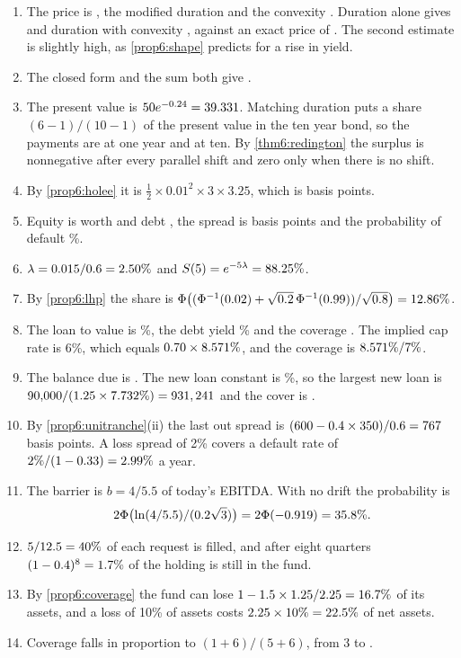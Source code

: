 \begin{chapterrefs}
\begin{enumerate}[label=\textbf{6.\arabic*}, leftmargin=*]
  \item The price is \xsOneP, the modified duration \xsOneD{} and the convexity \xsOneC. Duration alone
  gives \xsOneDur{} and duration with convexity \xsOneQd, against an exact price of \xsOneEx. The
  second estimate is slightly high, as \cref{prop6:shape} predicts for a rise in yield.
  \item The closed form and the sum both give \xsTwoD.
  \item The present value is $50e^{-0.24}=39.331$. Matching duration puts a share $(6-1)/(10-1)$ of
  the present value in the ten year bond, so the payments are \xsThreeA{} at one year and \xsThreeB{} at
  ten. By \cref{thm6:redington} the surplus is nonnegative after every parallel shift and zero only
  when there is no shift.
  \item By \cref{prop6:holee} it is $\tfrac12\times0.01^2\times3\times3.25$, which is \xsFour{} basis points.
  \item Equity is worth \xsFiveE{} and debt \xsFiveDebt, the spread is \xsFiveS{} basis points and the
  probability of default \xsFivePd\%.
  \item $\lambda=0.015/0.6=2.50\%$ and $S(5)=e^{-5\lambda}=88.25\%$.
  \item By \cref{prop6:lhp} the share is
  $\Phi\bigl((\Phi^{-1}(0.02)+\sqrt{0.2}\,\Phi^{-1}(0.99))/\sqrt{0.8}\bigr)=12.86\%$.
  \item The loan to value is \xsEightLtv\%, the debt yield \xsEightDy\% and the coverage
  \xsEightDscr. The implied cap rate is 6\%, which equals $0.70\times8.571\%$, and the coverage is
  $8.571\%/7\%$.
  \item The balance due is \xsNineB. The new loan constant is \xsNineK\%, so the largest new loan is
  $90{,}000/(1.25\times7.732\%)=931,241$ and the cover is \xsNineCover.
  \item By \cref{prop6:unitranche}(ii) the last out spread is $(600-0.4\times350)/0.6=767$ basis
  points. A loss spread of 2\% covers a default rate of $2\%/(1-0.33)=2.99\%$ a year.
  \item The barrier is $b=4/5.5$ of today's EBITDA. With no drift the probability is
  \[2\Phi\bigl(\ln(4/5.5)/(0.2\sqrt3)\bigr)=2\Phi(-0.919)=35.8\%.\]
  \item $5/12.5=40\%$ of each request is filled, and after eight quarters $(1-0.4)^8=1.7\%$ of
  the holding is still in the fund.
  \item By \cref{prop6:coverage} the fund can lose $1-1.5\times1.25/2.25=16.7\%$ of its assets, and a
  loss of 10\% of assets costs $2.25\times10\%=22.5\%$ of net assets.
  \item Coverage falls in proportion to $(1+6)/(5+6)$, from 3 to \xdIcr.
\end{enumerate}


\end{chapterrefs}

